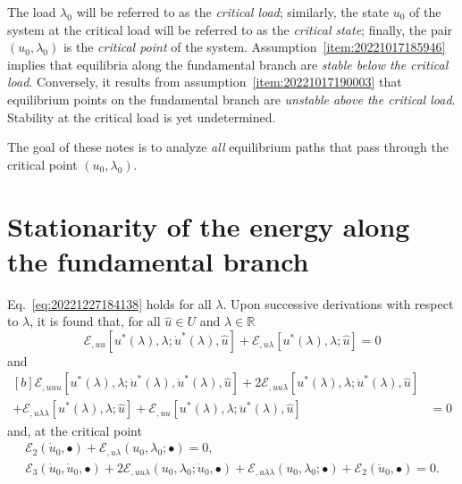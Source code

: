 \documentclass[12pt, final]{scrartcl}
\theoremstyle{definition}
\newcommand{\E}{\mathcal E}
\newcommand{\reals}{\mathbb{R}}
\begin{document}
The load \( \lambda_0\) will be referred to as the \emph{critical load}; similarly, the state \(u_0\) of the system at the
critical load will be referred to as the \emph{critical state}; finally, the pair \((u_0, \lambda_0)\) is the \emph{critical
  point} of the system. Assumption~\ref{item:20221017185946} implies that equilibria along the fundamental branch are
\emph{stable below the critical load}. Conversely, it results from assumption~\ref{item:20221017190003} that equilibrium
points on the fundamental branch are \emph{unstable above the critical load}. Stability at the critical load is yet
undetermined.

The goal of these notes is to analyze \emph{all} equilibrium paths that pass through the critical point \((u_0, \lambda_0)\).

\section{Stationarity of the energy along the fundamental branch}

Eq.~\eqref{eq:20221227184138} holds for all \(\lambda\). Upon successive derivations with respect to \(\lambda\), it is found that,
for all \(\hat{u} \in U\) and \(\lambda \in \reals\)
\begin{equation}
  \label{eq:20220901143843}
  \E_{,uu}[u^\ast(\lambda), \lambda; \dot{u}^\ast(\lambda), \hat{u}] + \E_{,u\lambda}[u^\ast(\lambda), \lambda; \hat{u}] = 0
\end{equation}
and
\begin{equation}
  \label{eq:20220901143902}
  \begin{aligned}[b]
    \E_{,uuu}[u^\ast(\lambda), \lambda; \dot{u}^\ast(\lambda), \dot{u}^\ast(\lambda), \hat{u}] + 2\E_{,uu\lambda}[u^\ast(\lambda), \lambda; \dot{u}^\ast(\lambda), \hat{u}] &\\
    + \E_{,u\lambda\lambda}[u^\ast(\lambda), \lambda; \hat{u}] + \E_{,uu}[u^\ast(\lambda), \lambda; \ddot{u}^\ast(\lambda), \hat{u}] &= 0
  \end{aligned}
\end{equation}
and, at the critical point
\begin{gather}
  \label{eq:20220901144331}
  \E_2(\dot{u}_0, \bullet) + \E_{,u\lambda}(u_0, \lambda_0; \bullet) = 0,\\
  \label{eq:20220901144335}
  \E_3(\dot{u}_0, \dot{u}_0, \bullet) + 2\E_{,uu\lambda}(u_0, \lambda_0; \dot{u}_0, \bullet) + \E_{,u\lambda\lambda}(u_0, \lambda_0; \bullet) + \E_2(\ddot{u}_0, \bullet) = 0.
\end{gather}
\end{document}
